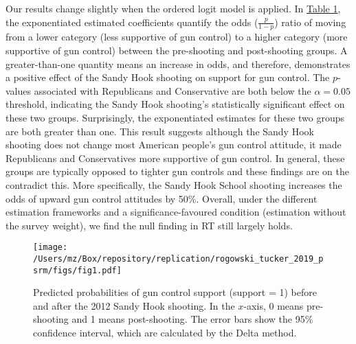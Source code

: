 \documentclass[11pt]{article}
\begin{document}
Our results change slightly when the ordered logit model is applied. In \hyperref[tab1]{Table 1}, the exponentiated estimated coefficients quantify the odds (\(\frac{p}{1-p}\)) ratio of moving from a lower category (less supportive of gun control) to a higher category (more supportive of gun control) between the pre-shooting and post-shooting groups. A greater-than-one quantity means an increase in odds, and therefore, demonstrates a positive effect of the Sandy Hook shooting on support for gun control. The \(p\)-values associated with Republicans and Conservative are both below the \(\alpha = 0.05\) threshold, indicating the Sandy Hook shooting’s statistically significant effect on these two groups. Surprisingly, the exponentiated estimates for these two groups are both greater than one. This result suggests although the Sandy Hook shooting does not change most American people’s gun control attitude, it made Republicans and Conservatives more supportive of gun control. In general, these groups are typically opposed to tighter gun controls and these findings are on the contradict this. More specifically, the Sandy Hook School shooting increases the odds of upward gun control attitudes by 50\%. Overall, under the different estimation frameworks and a significance-favoured condition (estimation without the survey weight), we find the null finding in RT still largely holds.
\begin{figure}[htbp!]
\centering
\texttt{[image: /Users/mz/Box/repository/replication/rogowski\_tucker\_2019\_psrm/figs/fig1.pdf]}
\captionsetup{justification = raggedright, singlelinecheck = false}
\caption{Predicted probabilities of gun control support (support = 1) before and after the 2012 Sandy Hook shooting. In the \(x\)-axis, 0 means pre-shooting and 1 means post-shooting. The error bars show the 95\% confidence interval, which are calculated by the Delta method.}\label{fig1}
\end{figure}

\end{document}
